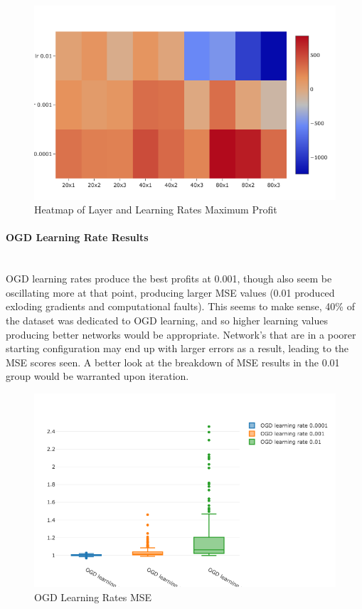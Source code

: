 \documentclass[a4paper,latin]{paper}
\begin{document}
\begin{figure}[H]
	\centering \includegraphics[scale=0.5]{images/synthetic_results/layers_lr_heatmap_max_profit.png}
	\caption{Heatmap of Layer and Learning Rates Maximum Profit}
	\label{figure-synthetic-layer-lr-profit}
\end{figure}

\paragraph{OGD Learning Rate Results}\mbox{}\\

OGD learning rates produce the best profits at 0.001, though also seem be oscillating more at that point, producing larger MSE values (0.01 produced exloding gradients and computational faults). This seems to make sense, 40\% of the dataset was dedicated to OGD learning, and so higher learning values producing better networks would be appropriate. Network's that are in a poorer starting configuration may end up with larger errors as a result, leading to the MSE scores seen. A better look at the breakdown of MSE results in the 0.01 group would be warranted upon iteration.


\begin{figure}[H]
	\centering \includegraphics[scale=0.5]{images/synthetic_results/bp_ogd_lr_mse.png}
	\caption{OGD Learning Rates MSE}
	\label{figure-synthetic-ogd-lr-mse}
\end{figure}
\end{document}
